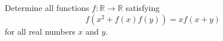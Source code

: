 Determine all functions $f : \mathbb{R} \to \mathbb{R}$ satisfying$$f(x^2 + f(x)f(y)) = xf(x + y)$$for all real numbers $x$ and $y$.